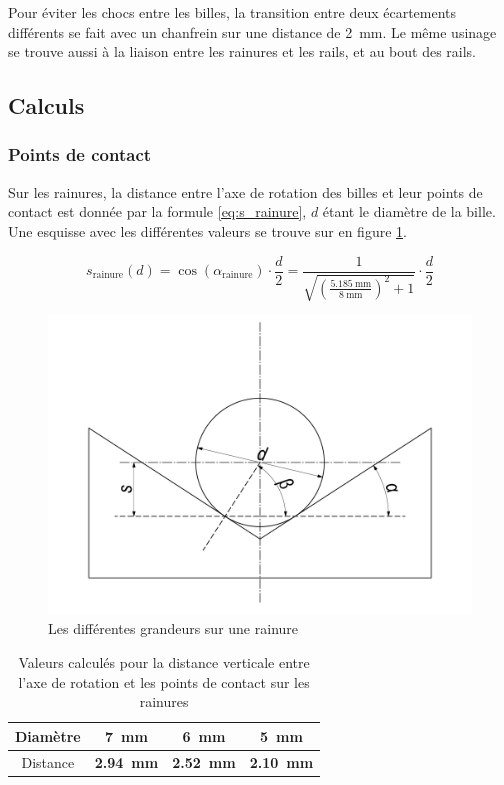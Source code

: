 Pour éviter les chocs entre les billes, la transition entre deux écartements différents se fait avec un chanfrein sur une distance de \SI{2}{\mm}. Le même usinage se trouve aussi à la liaison entre les rainures et les rails, et au bout des rails.

\subsection{Calculs}
\label{calculs_tri}
\subsubsection{Points de contact}
Sur les rainures, la distance entre l'axe de rotation des billes et leur points de contact est donnée par la formule \ref{eq:s_rainure}, $d$ étant le diamètre de la bille. Une esquisse avec les différentes valeurs se trouve sur en figure \ref{fig:esq_rainures_1}.

\begin{equation}
    s_{\text{rainure}}(d) = \cos(\alpha_{\text{rainure}}) \cdot \frac{d}{2} = \frac{1}{\sqrt{\left(\frac{\SI{5.185}{\milli\metre}}{\SI{8}{\milli\metre}}\right)^2+1}} \cdot \frac{d}{2}
    \label{eq:s_rainure}
\end{equation}

\begin{figure}
    \centering
    \includegraphics[width=  \textwidth]{Graphics/Rails/E_1}
    \caption{Les différentes grandeurs sur une rainure}
    \label{fig:esq_rainures_1}
\end{figure}

\begin{table}[htbp]
    \centering
    \begin{tabular}{|c|c|c|c|}
        \hline
        Diamètre    & \SI{7}{\mm} & \SI{6}{\mm} & \SI{5}{\mm} \\
        \hline
        Distance    & \textbf{\SI{2.94}{\mm}} & \textbf{\SI{2.52}{\mm}} & \textbf{\SI{2.10}{\mm}} \\
        \hline
    \end{tabular}
    \caption{Valeurs calculés pour la distance verticale entre l'axe de rotation et les points de contact sur les rainures}
    \label{tab:distance_rainures}
\end{table}

